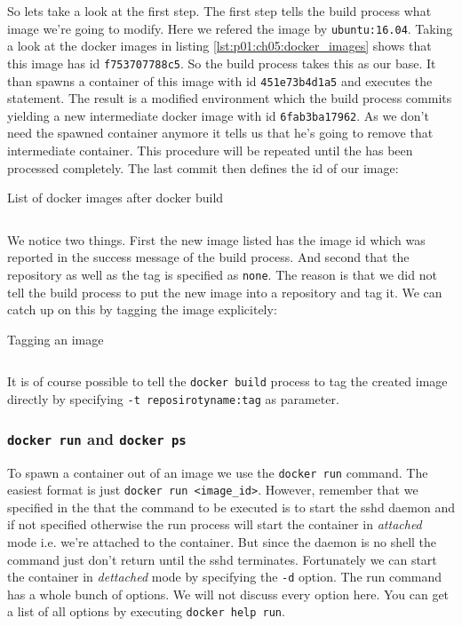			So lets take a look at the first step. The first step tells the build process what image we're going to modify. Here we refered the image by \texttt{ubuntu:16.04}. Taking a look at the docker images in listing \ref{lst:p01:ch05:docker_images} shows that this image has id \texttt{f753707788c5}. So the build process takes this as our base. It than spawns a container of this image with id \texttt{451e73b4d1a5} and executes the statement. The result is a modified environment which the build process commits yielding a new intermediate docker image with id \texttt{6fab3ba17962}. As we don't need the spawned container anymore it tells us that he's going to remove that intermediate container. This procedure will be repeated until the \dockerfile{} has been processed completely. The last commit then defines the id of our image:
			\begin{listing}[H]
				\caption{List of docker images after docker build}
				\label{lst:p01:ch05:list_images_after_build}
				\inputminted{text}{\relative{chapter_04/section_5.1.2/list_images_after_build.lst}}
			\end{listing}
			We notice two things. First the new image listed has the image id which was reported in the success message of the build process. And second that the repository as well as the tag is specified as \texttt{none}. The reason is that we did not tell the build process to put the new image into a repository and tag it. We can catch up on this by tagging the image explicitely:
			\begin{listing}[H]
				\caption{Tagging an image}
				\label{lst:p01:ch05:tag_image}
				\inputminted{text}{\relative{chapter_04/section_5.1.2/tag_image.lst}}
			\end{listing}
			It is of course possible to tell the \texttt{docker build} process to tag the created image directly by specifying \texttt{-t reposirotyname:tag} as parameter.
			\subsubsection{\texttt{docker run} and \texttt{docker ps}}
			To spawn a container out of an image we use the \texttt{docker run} command. The easiest format is just
			\texttt{docker run <image_id>}. However, remember that we specified in the \dockerfile{} that the command to be executed is to start the sshd daemon and if not specified otherwise the run process will start the container in \emph{attached} mode i.e. we're attached to the container. But since the daemon is no shell the command just don't return until the sshd terminates. Fortunately we can start the container in \emph{dettached} mode by specifying the \texttt{-d} option. The run command has a whole bunch of options. We will not discuss every option here. You can get a list of all options by executing \texttt{docker help run}.
			
